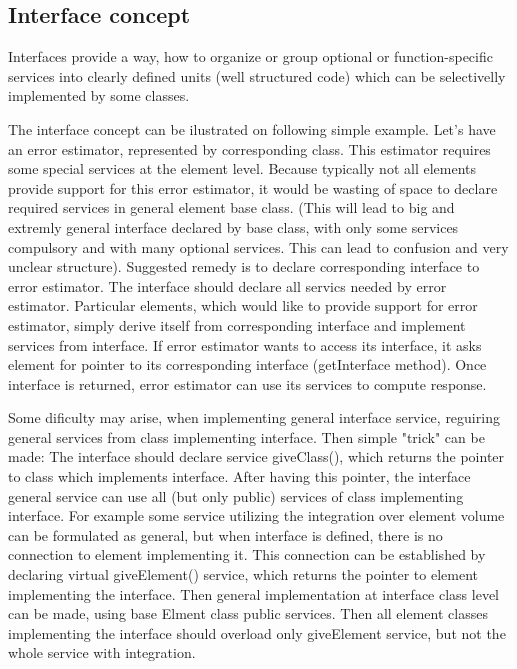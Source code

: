 \documentclass[a4paper]{article}
\begin{document}
\subsection{Interface concept}
Interfaces provide a way, how to organize or group optional or function-specific services into 
clearly defined units (well structured code) which can be
selectivelly implemented by some classes.

The interface concept can be ilustrated on following simple example. 
Let's have an error estimator, represented by corresponding class. This estimator requires some special 
services at the element level. Because typically not all elements provide support for this error estimator,
it would be wasting of space to declare required services in general element base class.
(This will lead to big and extremly general interface declared by base class, 
with only some services compulsory and with many optional services. This can lead to confusion and very unclear structure).
Suggested remedy is to declare corresponding interface to error estimator. The interface 
should declare all servics needed by error estimator. Particular elements, which would like to provide support for
error estimator, simply derive itself from corresponding interface and implement services from interface.
If error estimator wants to access its interface, it asks element for pointer to its corresponding interface
(getInterface method). Once interface is returned, error estimator can use its services to compute response.

Some dificulty may arise, when implementing general interface service, reguiring general services
from class implementing interface. Then simple "trick" can be made:
The interface should declare service giveClass(), which returns the pointer to class which implements interface.
After having this pointer, the interface general service can use all (but only public) services of class implementing
interface. For example some service utilizing the integration over element volume can be formulated as general,
but when interface is defined, there is no connection to element implementing it. This connection can be established
by declaring virtual giveElement() service, which returns the pointer to element implementing the interface. 
Then general implementation at interface class level can be made, using base Elment class public services. 
Then all element classes implementing the interface should overload only giveElement service, but not the whole 
service with integration.
\end{document}
